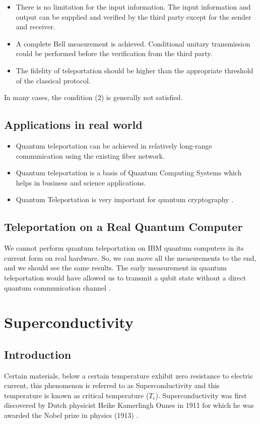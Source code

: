 \documentclass{article}
\begin{document}
\begin{itemize}
    \item There is no limitation for the input information. The input information and output can be supplied and verified by the third party except for the sender and receiver.
    \item A complete Bell measurement is achieved. Conditional unitary transmission could be performed before the verification from the third party.
    \item The fidelity of teleportation should be higher than the appropriate threshold of the classical protocol. 
\end{itemize}

In many cases, the condition (2) is generally not satisfied. 

\subsection{Applications in real world}
\begin{itemize}
    \item Quantum teleportation can be achieved in relatively long-range communication using the existing fiber network.\cite{qtapplications}
    \item Quantum teleportation is a basis of Quantum Computing Systems which helps in business and science applications. \cite{qtapplications}
    \item Quantum Teleportation is very important for quantum cryptography \cite{qtapplications}. 
\end{itemize}
 
\subsection{Teleportation on a Real Quantum Computer}
We cannot perform quantum teleportation on IBM quantum computers in its current form on real hardware. So, we can move all the measurements to the end, and we should see the same results. The early measurement in quantum teleportation would have allowed us to transmit a qubit state without a direct quantum communication channel \cite{telecode}.

\section{Superconductivity}

\subsection{Introduction}
Certain materials, below a certain temperature exhibit zero resistance to electric current, this phenomenon is referred to as Superconductivity and this temperature is known as critical temperature ($T_{c}$). Superconductivity was first discovered by Dutch physicist Heike Kamerlingh Onnes in 1911 for which he was awarded the Nobel prize in physics (1913) \cite{superwiki}.
\end{document}
